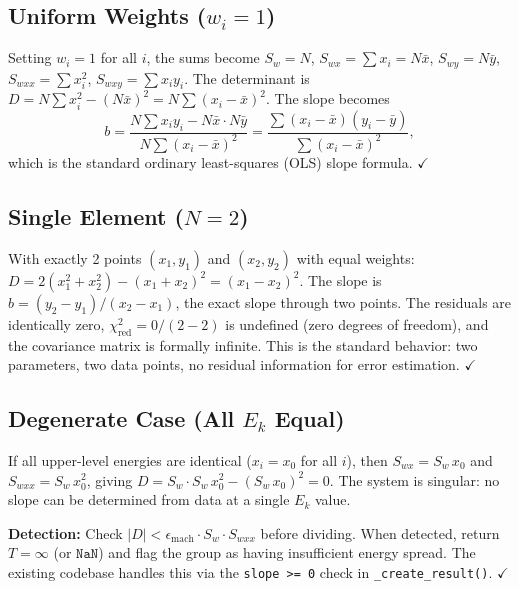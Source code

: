 \documentclass[11pt]{article}
\begin{document}

\subsection{Uniform Weights ($w_i = 1$)}

Setting $w_i = 1$ for all $i$, the sums become
$S_w = N$, $S_{wx} = \sum x_i = N\bar{x}$, $S_{wy} = N\bar{y}$,
$S_{wxx} = \sum x_i^2$, $S_{wxy} = \sum x_i y_i$.
The determinant is $D = N\sum x_i^2 - (N\bar{x})^2 = N\sum(x_i - \bar{x})^2$.
The slope becomes
\begin{equation}
  b = \frac{N\sum x_i y_i - N\bar{x}\cdot N\bar{y}}{N\sum(x_i-\bar{x})^2}
    = \frac{\sum(x_i - \bar{x})(y_i - \bar{y})}{\sum(x_i - \bar{x})^2},
  \label{eq:ols_slope}
\end{equation}
which is the standard ordinary least-squares (OLS) slope formula. $\checkmark$


\subsection{Single Element ($N = 2$)}

With exactly 2 points $(x_1, y_1)$ and $(x_2, y_2)$ with equal weights:
$D = 2(x_1^2 + x_2^2) - (x_1+x_2)^2 = (x_1-x_2)^2$.
The slope is $b = (y_2 - y_1)/(x_2 - x_1)$, the exact slope through two points.
The residuals are identically zero, $\chi^2_{\text{red}} = 0/(2-2)$ is undefined
(zero degrees of freedom), and the covariance matrix is formally infinite.
This is the standard behavior: two parameters, two data points, no residual
information for error estimation. $\checkmark$


\subsection{Degenerate Case (All $E_k$ Equal)}

If all upper-level energies are identical ($x_i = x_0$ for all $i$), then
$S_{wx} = S_w\,x_0$ and $S_{wxx} = S_w\,x_0^2$, giving
$D = S_w \cdot S_w\,x_0^2 - (S_w\,x_0)^2 = 0$.
The system is singular: no slope can be determined from data at a single
$E_k$ value.

\textbf{Detection:} Check $|D| < \epsilon_{\text{mach}} \cdot S_w \cdot S_{wxx}$
before dividing. When detected, return $T = \infty$ (or $\texttt{NaN}$) and flag
the group as having insufficient energy spread. The existing codebase handles
this via the \texttt{slope >= 0} check in \texttt{\_create\_result()}. $\checkmark$
\end{document}
